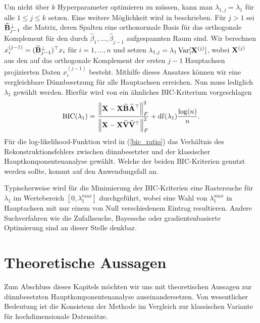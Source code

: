 Um nicht über $k$ Hyperparameter optimieren zu müssen, kann man $\lambda_{1,j} = \lambda_1$ für alle $1 \leq j \leq k$ setzen. Eine weitere Möglichkeit wird in \cite{croux} beschrieben. Für $j>1$ sei $\mathbf{\widehat{B}}_{j-1}^{\perp}$ die Matrix, deren Spalten eine orthonormale Basis für das orthogonale Komplement für den durch $\widehat{\beta}_1, \ldots, \widehat{\beta}_{j-1}$ aufgespannten Raum sind. Wir berechnen $x_i^{(j-1)} = (\mathbf{\widehat{B}}_{j-1}^{\perp})^{\top} x_i$ für $i = 1, \ldots, n$ und setzen $\lambda_{1,j} = \lambda_1\operatorname{Var}[\mathbf{X}^{(j)}]$, wobei $\mathbf{X}^{(j)}$ aus den auf das orthogonale Komplement der ersten $j-1$ Hauptachsen projizierten Daten $x_i^{(j-1)}$ besteht. Mithilfe dieses Ansatzes können wir eine vergleichbare Dünnbesetzung für alle Hauptachsen erreichen. Nun muss lediglich $\lambda_1$ gewählt werden. Hierfür wird von \cite{croux, guo} ein ähnliches BIC-Kriterium vorgeschlagen
\begin{align}
\label{bic_ratio}
\operatorname{BIC}(\lambda_1) = \frac{\left\lVert \mathbf{X} - \mathbf{X} \widehat{\mathbf{B}} \widehat{\mathbf{A}}^{\top} \right\rVert_{F}^{2}}{\left\lVert \mathbf{X} - \mathbf{X} \widehat{\mathbf{V}} \widehat{\mathbf{V}}^{\top} \right\rVert_{F}^{2}} + \operatorname{df}(\lambda_1) \frac{\log(n)}{n}.
\end{align}
Für die log-likelihood-Funktion wird in (\ref{bic_ratio}) das Verhältnis des Rekonstruktionsfehlers zwischen dünnbesetzter und der klassischer Hauptkomponentenanalyse gewählt. Welche der beiden BIC-Kriterien genutzt werden sollte, kommt auf den Anwendungsfall an.

Typischerweise wird für die Minimierung der BIC-Kriterien eine Rastersuche für $\lambda_1$ im Wertebereich $[0, \lambda_1^{max}]$ durchgeführt, wobei eine Wahl von $\lambda_1^{max}$ in Hauptachsen mit nur einem von Null verschiedenem Eintrag resultieren. Andere Suchverfahren wie die Zufallssuche, Bayessche oder gradientenbasierte Optimierung sind an dieser Stelle denkbar. 




\section{Theoretische Aussagen} 
\label{spca_theorems}


Zum Abschluss dieses Kapitels möchten wir uns mit theoretischen Aussagen zur dünnbesetzten Hauptkomponentenanalyse auseinandersetzen. Von wesentlicher Bedeutung ist die Konsistenz der Methode im Vergleich zur klassischen Variante für hochdimensionale Datensätze.

